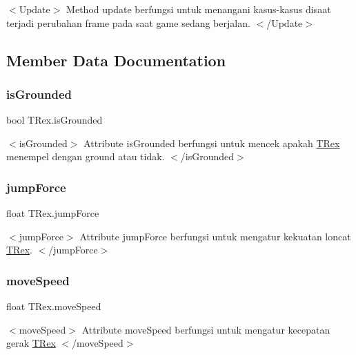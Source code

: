$<$\+Update$>$ Method update berfungsi untuk menangani kasus-\/kasus disaat terjadi perubahan frame pada saat game sedang berjalan. $<$/\+Update$>$ 

\subsection{Member Data Documentation}
\hypertarget{class_t_rex_a59fa915657244a351a19a6772868d10b}{}\label{class_t_rex_a59fa915657244a351a19a6772868d10b} 
\subsubsection{\texorpdfstring{is\+Grounded}{isGrounded}}
{\footnotesize\ttfamily bool T\+Rex.\+is\+Grounded}

$<$is\+Grounded$>$ Attribute is\+Grounded berfungsi untuk mencek apakah \hyperlink{class_t_rex}{T\+Rex} menempel dengan ground atau tidak. $<$/is\+Grounded$>$ \hypertarget{class_t_rex_ad3cb47a8543233f79fa0506bf4ab9bf9}{}\label{class_t_rex_ad3cb47a8543233f79fa0506bf4ab9bf9} 
\subsubsection{\texorpdfstring{jump\+Force}{jumpForce}}
{\footnotesize\ttfamily float T\+Rex.\+jump\+Force}

$<$jump\+Force$>$ Attribute jump\+Force berfungsi untuk mengatur kekuatan loncat \hyperlink{class_t_rex}{T\+Rex}. $<$/jump\+Force$>$ \hypertarget{class_t_rex_ac2c1c5682d54b9a34e81a87db7232133}{}\label{class_t_rex_ac2c1c5682d54b9a34e81a87db7232133} 
\subsubsection{\texorpdfstring{move\+Speed}{moveSpeed}}
{\footnotesize\ttfamily float T\+Rex.\+move\+Speed}

$<$move\+Speed$>$ Attribute move\+Speed berfungsi untuk mengatur kecepatan gerak \hyperlink{class_t_rex}{T\+Rex} $<$/move\+Speed$>$ \hypertarget{class_t_rex_a40c401b1a7d0fd1eddd6947f42da7bb8}{}\label{class_t_rex_a40c401b1a7d0fd1eddd6947f42da7bb8} 

